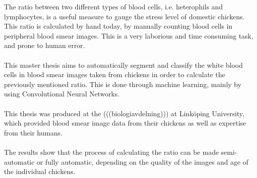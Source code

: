 The ratio between two different types of blood cells, i.e. heterophils and lymphocytes, is a useful measure to gauge the stress level of domestic chickens. This ratio is calculated by hand today, by manually counting blood cells in peripheral blood smear images. This is a very laborious and time consuming task, and prone to human error.\\\\
This master thesis aims to automatically segment and classify the white blood cells in blood smear images taken from chickens in order to calculate the previously mentioned ratio. This is done through machine learning, mainly by using Convolutional Neural Networks.\\\\
This thesis was produced at the (((biologiavdelning))) at Linköping University, which provided blood smear image data from their chickens as well as expertise from their humans.\\\\
The results show that the process of calculating the ratio can be made semi-automatic or fully automatic, depending on the quality of the images and age of the individual chickens. 